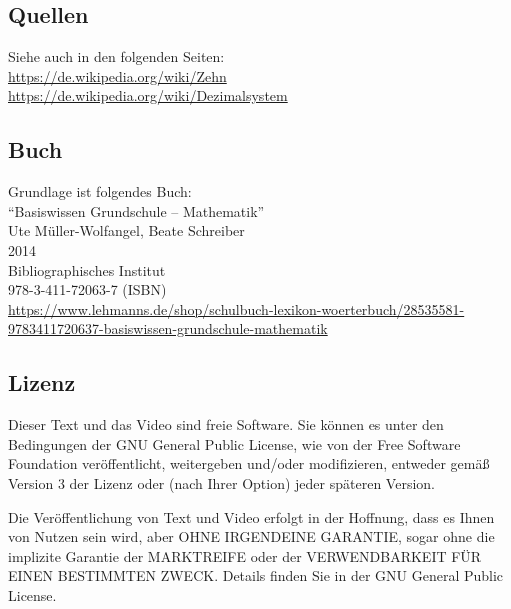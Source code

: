 \documentclass[a4paper]{amsart}
\theoremstyle{definition}
\begin{document}
\subsection*{Quellen}
Siehe auch in den folgenden Seiten:\\
\url{https://de.wikipedia.org/wiki/Zehn}\\
\url{https://de.wikipedia.org/wiki/Dezimalsystem}

\subsection*{Buch}
Grundlage ist folgendes Buch:\\
"`Basiswissen Grundschule – Mathematik"'\\
Ute Müller-Wolfangel, Beate Schreiber\\
2014\\
Bibliographisches Institut\\
978-3-411-72063-7 (ISBN)
\\
\url{https://www.lehmanns.de/shop/schulbuch-lexikon-woerterbuch/28535581-9783411720637-basiswissen-grundschule-mathematik}

\subsection*{Lizenz}
Dieser Text und das Video sind freie Software. Sie können es unter den Bedingungen der 
GNU General Public License, wie von der Free Software Foundation veröffentlicht, weitergeben 
und/oder modifizieren, entweder gemäß Version 3 der Lizenz oder (nach Ihrer Option) jeder späteren Version.

Die Veröffentlichung von Text und Video erfolgt in der Hoffnung, dass es Ihnen von Nutzen sein wird, 
aber OHNE IRGENDEINE GARANTIE, sogar ohne die implizite Garantie der MARKTREIFE oder der 
VERWENDBARKEIT FÜR EINEN BESTIMMTEN ZWECK. Details finden Sie in der GNU General Public License.
\end{document}
